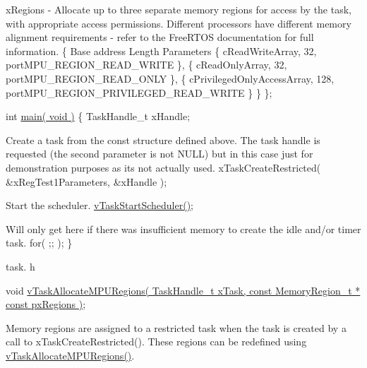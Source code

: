 \begin{DoxyPre}xRegions - Allocate up to three separate memory regions for access by
the task, with appropriate access permissions.  Different processors have
different memory alignment requirements - refer to the FreeRTOS documentation
for full information.
    \{
Base address                    Length  Parameters
        \{ cReadWriteArray,              32,     portMPU\_REGION\_READ\_WRITE \},
        \{ cReadOnlyArray,               32,     portMPU\_REGION\_READ\_ONLY \},
        \{ cPrivilegedOnlyAccessArray,   128,    portMPU\_REGION\_PRIVILEGED\_READ\_WRITE \}
    \}
\};\end{DoxyPre}



\begin{DoxyPre}int \hyperlink{main__mmc_8c_a840291bc02cba5474a4cb46a9b9566fe}{main( void )}
\{
TaskHandle\_t xHandle;\end{DoxyPre}



\begin{DoxyPre}Create a task from the const structure defined above.  The task handle
is requested (the second parameter is not NULL) but in this case just for
demonstration purposes as its not actually used.
    xTaskCreateRestricted( &xRegTest1Parameters, &xHandle );\end{DoxyPre}



\begin{DoxyPre}Start the scheduler.
    \hyperlink{task_8h_aaf9dca1065c60abdeb309d56ab7293cb}{vTaskStartScheduler()};\end{DoxyPre}



\begin{DoxyPre}Will only get here if there was insufficient memory to create the idle
and/or timer task.
    for( ;; );
\}
   \end{DoxyPre}


task. h 
\begin{DoxyPre}
 void \hyperlink{task_8h_ad889595baff9faf9efe02f3696825409}{vTaskAllocateMPURegions( TaskHandle\_t xTask, const MemoryRegion\_t * const pxRegions )};\end{DoxyPre}


Memory regions are assigned to a restricted task when the task is created by a call to x\-Task\-Create\-Restricted(). These regions can be redefined using \hyperlink{task_8h_ad889595baff9faf9efe02f3696825409}{v\-Task\-Allocate\-M\-P\-U\-Regions()}.


